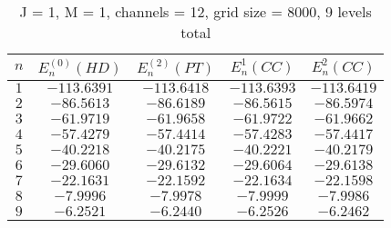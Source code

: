 \documentclass[12pt]{article}
\begin{document}
\begin{table}[H]
    \centering
    \caption{J = 1, M = 1, channels = 12, grid size = 8000, 9 levels total}
    \begin{tabular}{ccccc}
        \toprule
        $n$ & $E_n^{(0)}(HD)$ & $E_n^{(2)}(PT)$ & $E_n^1(CC)$ & $E_n^2(CC)$ \\ 
        \midrule
        $1$ & $-113.6391$ & $-113.6418$ & $-113.6393$ & $-113.6419$ \\ 
        $2$ & $-86.5613 $ & $-86.6189 $ & $-86.5615$  & $-86.5974$  \\
        $3$ & $-61.9719 $ & $-61.9658 $ & $-61.9722$  & $-61.9662$  \\
        $4$ & $-57.4279 $ & $-57.4414 $ & $-57.4283$  & $-57.4417$  \\
        $5$ & $-40.2218 $ & $-40.2175 $ & $-40.2221$  & $-40.2179$  \\
        $6$ & $-29.6060 $ & $-29.6132 $ & $-29.6064$  & $-29.6138$  \\
        $7$ & $-22.1631 $ & $-22.1592 $ & $-22.1634$  & $-22.1598$  \\
        $8$ & $-7.9996  $ & $-7.9978  $ & $-7.9999 $  & $-7.9986 $  \\
        $9$ & $-6.2521  $ & $-6.2440  $ & $-6.2526 $  & $-6.2462 $  \\
       \bottomrule
    \end{tabular}
\end{table}
\end{document}

